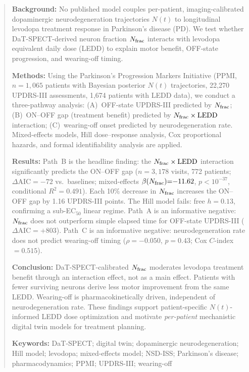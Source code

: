 \begin{abstract}
\noindent
\textbf{Background:}
No published model couples per-patient, imaging-calibrated dopaminergic
neurodegeneration trajectories $N(t)$ to longitudinal levodopa treatment
response in Parkinson's disease (PD). We test whether DaT-SPECT-derived
neuron fraction $\Nfrac$ interacts with levodopa equivalent daily dose
(LEDD) to explain motor benefit, OFF-state progression, and wearing-off
timing.

\noindent
\textbf{Methods:}
Using the Parkinson's Progression Markers Initiative (PPMI, $n{=}1{,}065$
patients with Bayesian posterior $N(t)$ trajectories, 22,270 UPDRS-III
assessments, 1,674 patients with LEDD data), we conduct a three-pathway
analysis: (A)~OFF-state UPDRS-III predicted by $\Nfrac$;
(B)~ON--OFF gap (treatment benefit) predicted by $\Nfrac \times \LEDD$
interaction; (C)~wearing-off onset predicted by neurodegeneration rate.
Mixed-effects models, Hill dose--response analysis, Cox proportional
hazards, and formal identifiability analysis are applied.

\noindent
\textbf{Results:}
Path~B is the headline finding: the $\Nfrac \times \LEDD$ interaction
significantly predicts the ON--OFF gap ($n{=}3{,}178$ visits, 772 patients;
$\Delta\mathrm{AIC}{=}{-}72$ vs.\ baselines; mixed-effects $\beta(\Nfrac){=}{-}11.62$,
$p{<}10^{-37}$, conditional $R^2{=}0.491$). Each 10\% decrease in $\Nfrac$
increases the ON--OFF gap by 1.16 UPDRS-III points. The Hill model fails:
free $h{=}0.13$, confirming a sub-EC$_{50}$ linear regime. Path~A is an
informative negative: $\Nfrac$ does not outperform simple elapsed time for
OFF-state UPDRS-III ($\Delta\mathrm{AIC}{=}{+}803$). Path~C is an
informative negative: neurodegeneration rate does not predict wearing-off
timing ($\rho{=}{-}0.050$, $p{=}0.43$; Cox $C$-index${=}0.515$).

\noindent
\textbf{Conclusion:}
DaT-SPECT-calibrated $\Nfrac$ moderates levodopa treatment benefit through
an interaction effect, not as a main effect. Patients with fewer surviving
neurons derive less motor improvement from the same LEDD. Wearing-off is
pharmacokinetically driven, independent of neurodegeneration rate. These
findings support patient-specific $N(t)$-informed LEDD dose
optimization and motivate \textit{per-patient} mechanistic digital twin
models for treatment planning.

\medskip
\noindent
\textbf{Keywords:}
DaT-SPECT; digital twin; dopaminergic neurodegeneration; Hill model;
levodopa; mixed-effects model; NSD-ISS; Parkinson's disease;
pharmacodynamics; PPMI; UPDRS-III; wearing-off
\end{abstract}


